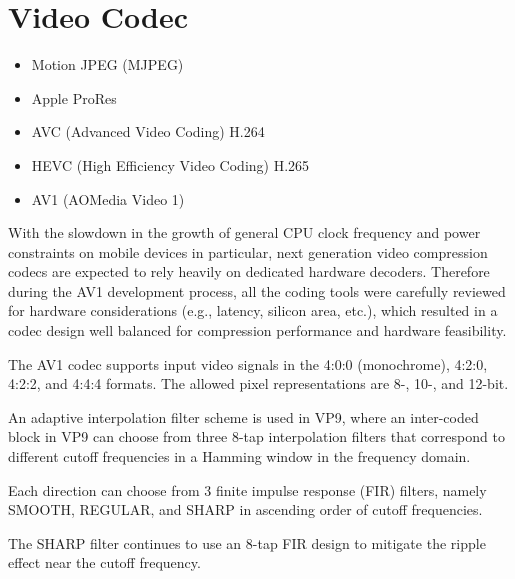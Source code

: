 \documentclass[11pt]{article}
\begin{document}
\section{Video Codec}

\begin{itemize}
    \item Motion JPEG (MJPEG)\cite{wiki:mjpeg}
    \item Apple ProRes\cite{wiki:prores}
    \item AVC (Advanced Video Coding) H.264\cite{wiki:h264}
    \item HEVC (High Efficiency Video Coding) H.265\cite{wiki:h265}
    \item AV1 (AOMedia Video 1)\cite{wiki:av1}
\end{itemize}

With the slowdown in the growth of general CPU clock frequency and power
constraints on mobile devices in particular, next generation video compression
codecs are expected to rely heavily on dedicated hardware decoders. Therefore
during the AV1 development process, all the coding tools were carefully reviewed
for hardware considerations (e.g., latency, silicon area, etc.), which resulted
in a codec design well balanced for compression performance and hardware
feasibility.

The AV1 codec supports input video signals in the 4:0:0 (monochrome), 4:2:0,
4:2:2, and 4:4:4 formats. The allowed pixel representations are 8-, 10-, and
12-bit.

An adaptive interpolation filter scheme is used in VP9, where an inter-coded
block in VP9 can choose from three 8-tap interpolation filters that correspond
to different cutoff frequencies in a Hamming window in the frequency domain.

Each direction can choose from 3 finite impulse response (FIR) filters, namely
SMOOTH, REGULAR, and SHARP in ascending order of cutoff frequencies.

The SHARP filter continues to use an 8-tap FIR design to mitigate the ripple
effect near the cutoff frequency.\cite{av1:tech}

\newpage
\printbibliography
\end{document}
